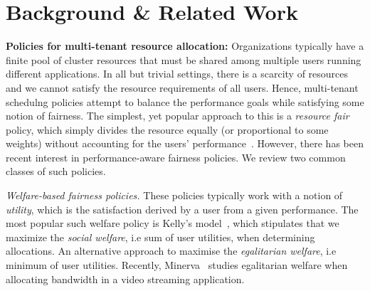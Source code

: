 

\section{Background \& Related Work}
\label{sec:related}

\textbf{Policies for multi-tenant resource allocation:}
Organizations typically have a finite pool of cluster resources that must be shared
among multiple users running different applications.
In all but trivial settings, there is a scarcity of resources and we cannot satisfy the resource
requirements of all users.
Hence, multi-tenant schedulng policies attempt to balance the performance goals
while satisfying some notion of fairness.
The simplest, yet popular approach to this is a \emph{resource fair} policy,
which simply divides the resource
equally (or proportional to some weights) without accounting for the users'
performance~\citep{jiang2012improving,isard2009quincy,hadoopfs,mo2000fair}.
However, there has been recent interest in performance-aware fairness policies.
We review two common classes of such policies. 

\emph{Welfare-based fairness policies.}
These policies typically work with a notion of \emph{utility}, which is the satisfaction
derived by a user from a given performance.
The most popular such welfare policy is Kelly's model~\citep{kelly1998rate},
which stipulates that we maximize the
\emph{social welfare}, i.e sum of user utilities, when determining allocations.
An alternative approach to maximise the
\emph{egalitarian welfare}, i.e minimum of user utilities.
Recently, 
Minerva~\citep{nathan2019end} studies egalitarian welfare when allocating bandwidth 
in a video streaming application.


